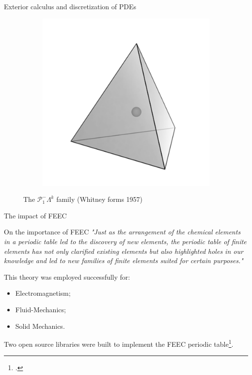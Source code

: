 \documentclass{beamer}
\begin{document}
\begin{frame}{Exterior calculus and discretization of PDEs}
\begin{figure}[t]
\begin{subfigure}[t]{0.23\textwidth}
		\end{subfigure}\hfill
		\begin{subfigure}[t]{0.23\textwidth}
			\includegraphics[width=\columnwidth]{dP0_tetrahedron.pdf}%
		\end{subfigure}\hfill
	\caption{The $\mathcal{P}^-_1\Lambda^k$ family (Whitney forms 1957)}
	\end{figure}
\end{frame}

\begin{frame}{The impact of FEEC}
	\begin{block}{On the importance of FEEC}
		\textit{"Just as the arrangement of the chemical elements in a periodic table led to the discovery of new elements, the periodic table of finite elements has not only clarified existing elements but also highlighted holes in our knowledge and led to new families of finite elements suited for certain purposes."}
	\end{block}
 This theory was employed successfully for:
	\begin{itemize}
	\item Electromagnetism;
	\item Fluid-Mechanics;
	\item Solid Mechanics.
	\end{itemize}
	Two open source libraries were built to implement the FEEC periodic table\footcite{logg2012,rathgeber2017firedrake}.
\end{frame}
\end{document}
